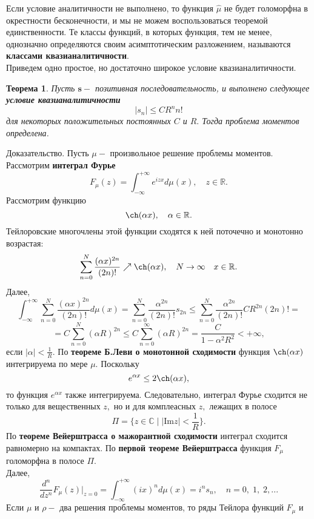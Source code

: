 \documentclass[12 pt, a4 paper]{article}
\theoremstyle{plain}   \newtheorem{Pro}{Задача}
\newtheorem{The}{Теорема}
\begin{document}
Если условие аналитичности не выполнено, то функция
$ \hat \mu $
не будет голоморфна в окрестности бесконечности, и мы не
можем воспользоваться теоремой единственности. Те классы
функций, в которых функция, тем не менее, однозначно
определяются своим асимптотическим разложением, называются
{\bfseries классами квазианалитичности}.
\\
Приведем одно простое, но достаточно широкое условие
квазианалитичности.
\begin{The}
Пусть
$ \mathbf{s} - $
позитивная последовательность, и выполнено следующее
{\bfseries условие квазианалитичности}
$$
  |s_n | \leq C R^n n!
$$
для некоторых положительных постоянных
$ C $
и
$ R . $
Тогда проблема моментов определена.
\end{The}
{\Large Доказательство.}
Пусть
$ \mu - $
произвольное решение проблемы моментов. Рассмотрим
{\bfseries интеграл Фурье}
$$
  F_{\mu}(z)=\int _{-\infty}^{+\infty}
  e^{izx}d\mu (x), \quad z \in \mathbb{R}.
$$
Рассмотрим функцию
$$
  \ch(\alpha x), \quad \alpha \in \mathbb{R}.
$$
Тейлоровские многочлены этой функции сходятся к ней
поточечно и монотонно возрастая:
$$
  \sum _{n=0}^N \frac{(\alpha x)^{2n}}{(2n)!}
  \nearrow \ch (\alpha x), \quad N \rightarrow \infty
  \quad x \in \mathbb{R} .
$$
Далее,
$$
  \int _{-\infty}^{+\infty} \sum _{n=0}^N
  \frac{(\alpha x)^{2n}}{(2n)!}d\mu (x)=
  \sum _{n=0}^N\frac{\alpha ^{2n}}{(2n)!}s_{2n} \leq
  \sum _{n=0}^N \frac{\alpha ^{2n}}{(2n)!}CR^{2n}(2n)!=
$$
$$
  =C \sum _{n=0}^N (\alpha R)^{2n} \leq
  C \sum _{n=0}^{\infty} (\alpha R)^{2n}=
  \frac{C}{1-\alpha ^2 R^2} <+\infty ,
$$
если
$ | \alpha |<\frac{1}{R} . $
По
{\bfseries теореме Б.Леви о монотонной сходимости}
функция
$ \ch (\alpha x) $
интегрируема по мере
$ \mu . $
Поскольку
$$
  e^{\alpha x} \leq 2 \ch (\alpha x),
$$
то функция
$ e^{\alpha x} $
также интегрируема. Следовательно, интеграл Фурье сходится
не только для вещественных
$ z , $
но и для комплеасных
$ z , $
лежащих в полосе
$$
  \Pi = \{ z \in \mathbb{C} \; | \; |\mathrm{Im} z |<\frac{1}{R} \} .
$$
По
{\bfseries теореме Вейерштрасса о мажорантной сходимости}
интеграл сходится равномерно на компактах.
По
{\bfseries первой теореме Вейерштрасса}
функция
$ F_{\mu} $
голоморфна в полосе
$ \Pi . $
\\
Далее,
$$
  \frac{d^n}{dz^n}F_{\mu}(z)|_{z=0}=
  \int _{-\infty}^{+\infty}(ix)^n d\mu (x)=
  i^n s_n , \quad n=0, \; 1, \; 2,...
$$
Если
$ \mu $
и
$ \rho - $
два решения проблемы моментов, то ряды Тейлора функций
$ F_{\mu } $
и
\end{document}
